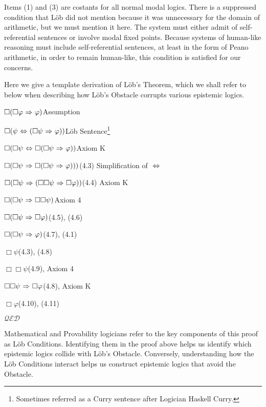 Items (1) and (3) are costants for all normal modal logics. There is a suppressed condition that L\"ob did not mention because it was unnecessary for the domain of arithmetic, but we must mention it here. The system must either admit of self-referential sentences or involve modal fixed points. Because systems of human-like reasoning must include self-referential sentences, at least in the form of Peano arithmetic, in order to remain human-like, this condition is satisfied for our concerns. 

Here we give a template derivation of L\"ob's Theorem, which we shall refer to below when describing how L\"ob's Obstacle corrupts various epistemic logics.

\begin{proofenum}
	\item $\Box(\Box\varphi {\ \Rightarrow \ } \varphi)$\mbox{}\dotfill Assumption
	\item $\Box(\psi {\ \Leftrightarrow \ } (\Box\psi{\ \Rightarrow \ } \varphi))$\mbox{}\dotfill L\"ob Sentence\footnote{Sometimes referred as a Curry sentence after Logician Haskell Curry.}
	\item $\Box(\Box\psi {\ \Leftrightarrow \ } \Box(\Box\psi {\ \Rightarrow \ } \varphi))$\mbox{}\dotfill Axiom K
	\item $\Box(\Box\psi {\ \Rightarrow \ } \Box(\Box\psi {\ \Rightarrow \ } \varphi)))$\mbox{}\dotfill (4.3) Simplification of ${\ \Leftrightarrow \ }$
	\item $\Box(\Box\psi {\ \Rightarrow \ } (\Box\Box\psi {\ \Rightarrow \ } \Box\varphi))$\mbox{}\dotfill (4.4) Axiom K
	\item $\Box(\Box\psi {\ \Rightarrow \ } \Box\Box\psi)$\mbox{}\dotfill Axiom 4
	\item $\Box(\Box\psi {\ \Rightarrow \ } \Box\varphi)$\mbox{}\dotfill (4.5), (4.6)
	\item $\Box(\Box\psi {\ \Rightarrow \ } \varphi)$\mbox{}\dotfill (4.7), (4.1)
	\item $\Box\psi$\mbox{}\dotfill (4.3), (4.8)
	\item $\Box\Box\psi$\mbox{}\dotfill (4.9), Axiom 4
	\item $\Box\Box\psi {\ \Rightarrow \ } \Box\varphi$\mbox{}\dotfill (4.8), Axiom K
	\item $\Box\varphi$\mbox{}\dotfill (4.10), (4.11)
\end{proofenum}\mbox{}\hfill $\mathcal{QED}$

Mathematical and Provability logicians refer to the key components of this proof as L\"ob Conditions. Identifying them in the proof above helps us identify which epistemic logics collide with L\"ob's Obstacle. Conversely, understanding how the L\"ob Conditions interact helps us construct epistemic logics that avoid the Obstacle.

